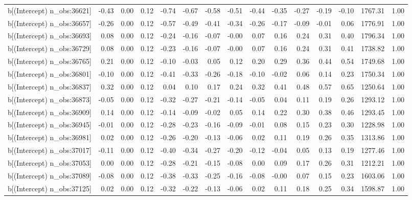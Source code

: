 \begin{table}[ht]
\begin{tabular}{rrrrrrrrrrrrrrr}
  b[(Intercept) n\_obs:36621] & -0.43 & 0.00 & 0.12 & -0.74 & -0.67 & -0.58 & -0.51 & -0.44 & -0.35 & -0.27 & -0.19 & -0.10 & 1767.31 & 1.00 \\ 
  b[(Intercept) n\_obs:36657] & -0.26 & 0.00 & 0.12 & -0.57 & -0.49 & -0.41 & -0.34 & -0.26 & -0.17 & -0.09 & -0.01 & 0.06 & 1776.91 & 1.00 \\ 
  b[(Intercept) n\_obs:36693] & 0.08 & 0.00 & 0.12 & -0.24 & -0.16 & -0.07 & -0.00 & 0.07 & 0.16 & 0.24 & 0.31 & 0.40 & 1796.34 & 1.00 \\ 
  b[(Intercept) n\_obs:36729] & 0.08 & 0.00 & 0.12 & -0.23 & -0.16 & -0.07 & -0.00 & 0.07 & 0.16 & 0.24 & 0.31 & 0.41 & 1738.82 & 1.00 \\ 
  b[(Intercept) n\_obs:36765] & 0.21 & 0.00 & 0.12 & -0.10 & -0.03 & 0.05 & 0.12 & 0.20 & 0.29 & 0.36 & 0.44 & 0.54 & 1749.68 & 1.00 \\ 
  b[(Intercept) n\_obs:36801] & -0.10 & 0.00 & 0.12 & -0.41 & -0.33 & -0.26 & -0.18 & -0.10 & -0.02 & 0.06 & 0.14 & 0.23 & 1750.34 & 1.00 \\ 
  b[(Intercept) n\_obs:36837] & 0.32 & 0.00 & 0.12 & 0.04 & 0.10 & 0.17 & 0.24 & 0.32 & 0.41 & 0.48 & 0.57 & 0.65 & 1250.64 & 1.00 \\ 
  b[(Intercept) n\_obs:36873] & -0.05 & 0.00 & 0.12 & -0.32 & -0.27 & -0.21 & -0.14 & -0.05 & 0.04 & 0.11 & 0.19 & 0.26 & 1293.12 & 1.00 \\ 
  b[(Intercept) n\_obs:36909] & 0.14 & 0.00 & 0.12 & -0.14 & -0.09 & -0.02 & 0.05 & 0.14 & 0.22 & 0.30 & 0.38 & 0.46 & 1293.45 & 1.00 \\ 
  b[(Intercept) n\_obs:36945] & -0.01 & 0.00 & 0.12 & -0.28 & -0.23 & -0.16 & -0.09 & -0.01 & 0.08 & 0.15 & 0.23 & 0.30 & 1228.98 & 1.00 \\ 
  b[(Intercept) n\_obs:36981] & 0.02 & 0.00 & 0.12 & -0.26 & -0.20 & -0.13 & -0.06 & 0.02 & 0.11 & 0.19 & 0.26 & 0.35 & 1313.86 & 1.00 \\ 
  b[(Intercept) n\_obs:37017] & -0.11 & 0.00 & 0.12 & -0.40 & -0.34 & -0.27 & -0.20 & -0.12 & -0.04 & 0.05 & 0.13 & 0.19 & 1277.46 & 1.00 \\ 
  b[(Intercept) n\_obs:37053] & 0.00 & 0.00 & 0.12 & -0.28 & -0.21 & -0.15 & -0.08 & 0.00 & 0.09 & 0.17 & 0.26 & 0.31 & 1212.21 & 1.00 \\ 
  b[(Intercept) n\_obs:37089] & -0.08 & 0.00 & 0.12 & -0.38 & -0.33 & -0.25 & -0.16 & -0.08 & -0.00 & 0.07 & 0.15 & 0.23 & 1603.06 & 1.00 \\ 
  b[(Intercept) n\_obs:37125] & 0.02 & 0.00 & 0.12 & -0.32 & -0.22 & -0.13 & -0.06 & 0.02 & 0.11 & 0.18 & 0.25 & 0.34 & 1598.87 & 1.00 \\ 

\end{tabular}
\end{table}
